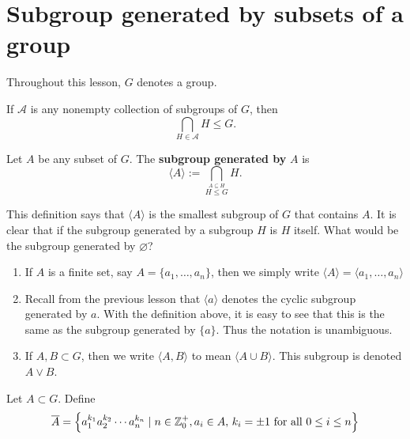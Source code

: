 \documentclass[11pt,a4paper]{article}
\begin{document}
\def\contador{Lesson 8}



\section{Subgroup generated by subsets of a group}

Throughout this lesson, \(G\) denotes a group.

\begin{prop}
    If \(\mathcal{A}\) is any nonempty collection of subgroups of \(G\), then 
    \[\bigcap_{H\in \mathcal{A}} H \leq G.\]
\end{prop}



\begin{defi}
Let \(A\) be any subset of \(G\).
The \textbf{subgroup generated by} \(A\) is 
\[\langle A\rangle := \bigcap_{\stackrel{A\subseteq H }{H\leq G }  } H .\]
\end{defi}

This definition says that \(\langle A\rangle \) is the smallest subgroup of \(G\) that contains \(A\). 
It is clear that if the subgroup generated by a subgroup \(H\) is \(H\) itself. 
What would be the subgroup generated by \(\varnothing\)?


\begin{rem}
\begin{enumerate}[label=(\roman*)]
    \item      If \(A \) is a finite set, say \(A = \{a_1, \ldots, a_n \}\),
    then we simply write \(\langle A\rangle = \langle a_1, \ldots, a_n \rangle \)

    \item Recall from the previous lesson that \(\langle a\rangle\) denotes the cyclic subgroup generated by \(a\).
    With the definition above, it is easy to see that this is the same as the subgroup generated by \(\{a\}\).
    Thus the notation is unambiguous.

    \item If \(A,B\subset G\), then we write  \(\langle A, B \rangle\) to mean  \(\langle A\cup B\rangle \).
    This subgroup is denoted \(A \vee B\). 
\end{enumerate}
\end{rem}
 
\begin{defi}
    Let \(A\subset G\).
    Define 
    \[\overline{A} = \left\{ a_1^{k_1} a_2^{k_2} \cdots a_{n}^{k_n} \mid n\in \mathbb{Z}_0^+, a_i \in A ,\, k_i = \pm 1 \text{ for all } 0 \leq i\leq n \right\}\]
\end{defi}
\end{document}
